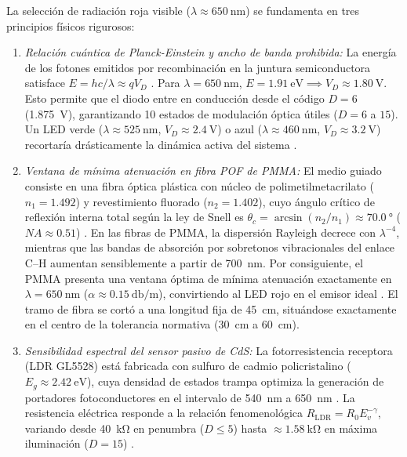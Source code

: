 \documentclass[journal,transmag]{IEEEtran}
\begin{document}
La selección de radiación roja visible ($\lambda \approx \SI{650}{\nano\meter}$) se fundamenta en tres principios físicos rigurosos:
\begin{enumerate}
\item \emph{Relación cuántica de Planck-Einstein y ancho de banda prohibida:} La energía de los fotones emitidos por recombinación en la juntura semiconductora satisface $E = hc/\lambda \approx q V_D$ \cite{tipler2010,kasap2013}. Para $\lambda = \SI{650}{\nano\meter}$, $E = \SI{1.91}{\electronvolt} \implies V_D \approx \SI{1.80}{\volt}$. Esto permite que el diodo entre en conducción desde el código $D = 6$ (\SI{1.875}{\volt}), garantizando 10 estados de modulación óptica útiles ($D=6$ a $15$). Un LED verde ($\lambda \approx \SI{525}{\nano\meter}$, $V_D \approx \SI{2.4}{\volt}$) o azul ($\lambda \approx \SI{460}{\nano\meter}$, $V_D \approx \SI{3.2}{\volt}$) recortaría drásticamente la dinámica activa del sistema \cite{kasap2013}.
\item \emph{Ventana de mínima atenuación en fibra POF de PMMA:} El medio guiado consiste en una fibra óptica plástica con núcleo de polimetilmetacrilato ($n_1 = 1.492$) y revestimiento fluorado ($n_2 = 1.402$), cuyo ángulo crítico de reflexión interna total según la ley de Snell es $\theta_c = \arcsin(n_2/n_1) \approx \SI{70.0}{\degree}$ ($NA \approx 0.51$) \cite{tipler2010,ziemann2008}. En las fibras de PMMA, la dispersión Rayleigh decrece con $\lambda^{-4}$, mientras que las bandas de absorción por sobretonos vibracionales del enlace C--H aumentan sensiblemente a partir de \SI{700}{\nano\meter}. Por consiguiente, el PMMA presenta una ventana óptima de mínima atenuación exactamente en $\lambda = \SI{650}{\nano\meter}$ ($\alpha \approx \SI{0.15}{\decibel\per\meter}$), convirtiendo al LED rojo en el emisor ideal \cite{ziemann2008}. El tramo de fibra se cortó a una longitud fija de \SI{45}{\centi\meter}, situándose exactamente en el centro de la tolerancia normativa (\SI{30}{\centi\meter} a \SI{60}{\centi\meter}).
\item \emph{Sensibilidad espectral del sensor pasivo de CdS:} La fotorresistencia receptora (LDR GL5528) está fabricada con sulfuro de cadmio policristalino ($E_g \approx \SI{2.42}{\electronvolt}$), cuya densidad de estados trampa optimiza la generación de portadores fotoconductores en el intervalo de \SI{540}{\nano\meter} a \SI{650}{\nano\meter} \cite{rose1963,streetman2016}. La resistencia eléctrica responde a la relación fenomenológica $R_{\text{LDR}} = R_0 E_v^{-\gamma}$, variando desde \SI{40}{\kilo\ohm} en penumbra ($D \le 5$) hasta $\approx \SI{1.58}{\kilo\ohm}$ en máxima iluminación ($D=15$) \cite{rose1963}.
\end{enumerate}
\end{document}
